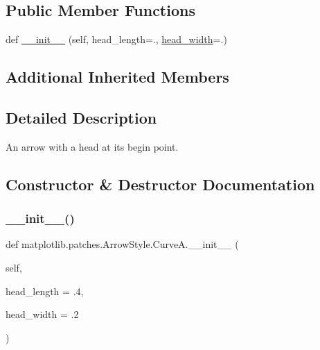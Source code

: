 \subsection*{Public Member Functions}
\begin{DoxyCompactItemize}
\item 
def \hyperlink{classmatplotlib_1_1patches_1_1ArrowStyle_1_1CurveA_a16ad8b857d121beaae32646354809186}{\+\_\+\+\_\+init\+\_\+\+\_\+} (self, head\+\_\+length=., \hyperlink{classmatplotlib_1_1patches_1_1ArrowStyle_1_1__Curve_a360e40f4780784399d97fd36b8569ab7}{head\+\_\+width}=.)
\end{DoxyCompactItemize}
\subsection*{Additional Inherited Members}


\subsection{Detailed Description}
\begin{DoxyVerb}An arrow with a head at its begin point.\end{DoxyVerb}
 

\subsection{Constructor \& Destructor Documentation}
\mbox{\label{classmatplotlib_1_1patches_1_1ArrowStyle_1_1CurveA_a16ad8b857d121beaae32646354809186}} 
\subsubsection{\texorpdfstring{\+\_\+\+\_\+init\+\_\+\+\_\+()}{\_\_init\_\_()}}
{\footnotesize\ttfamily def matplotlib.\+patches.\+Arrow\+Style.\+Curve\+A.\+\_\+\+\_\+init\+\_\+\+\_\+ (\begin{DoxyParamCaption}\item[{}]{self,  }\item[{}]{head\+\_\+length = {\ttfamily .4},  }\item[{}]{head\+\_\+width = {\ttfamily .2} }\end{DoxyParamCaption})}


